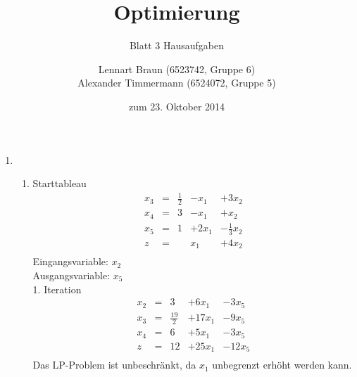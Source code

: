 \documentclass[a4paper]{scrartcl}
\title{Optimierung}
\subtitle{Blatt 3 Hausaufgaben}
\author{
	Lennart Braun (6523742, Gruppe 6) \\
    Alexander Timmermann (6524072, Gruppe 5)
}
\date{zum 23. Oktober 2014}
\begin{document}
\maketitle

\begin{enumerate}
    \item %
        \begin{enumerate}
            \item
                Starttableau
                \begin{equation}
                    \begin{array}{rcrrr}
                        x_3 & = & \frac{1}{2} & -x_1 & +3x_2 \\
                        x_4 & = & 3 & -x_1 & +x_2 \\
                        x_5 & = & 1 & +2x_1 & -\frac{1}{3}x_2 \\
                        \hline
                        z   & = &   & x_1 & +4x_2 \\
                    \end{array}
                \end{equation}
                Eingangsvariable: $x_2$ \\
                Ausgangsvariable: $x_5$ \\

                1. Iteration
                \begin{equation}
                    \begin{array}{rcrrr}
                        x_2 & = & 3 & +6x_1 & -3x_5 \\
                        x_3 & = & \frac{19}{2} & +17x_1 & -9x_5 \\
                        x_4 & = & 6 & +5x_1 & -3x_5 \\
                        \hline
                        z   & = & 12 & +25x_1 & -12x_5 \\
                    \end{array}
                \end{equation}
                Das LP-Problem ist unbeschränkt, da $x_1$ unbegrenzt erhöht
                werden kann.


\end{enumerate}
\end{enumerate}
\end{document}
